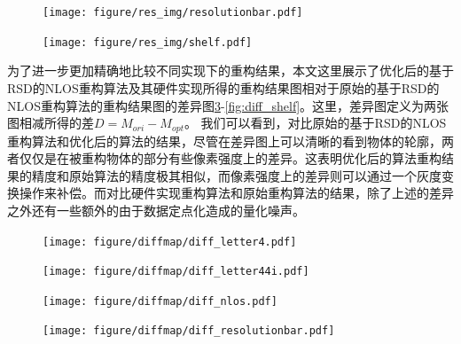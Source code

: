 \documentclass[master]{shtthesis}             %
\begin{document}
\begin{figure}[htbp]
  \centering
  \texttt{[image: figure/res\_img/resolutionbar.pdf]}
  \label{fig:resolutionbar}
\end{figure}

\begin{figure}[htbp]
  \centering
  \texttt{[image: figure/res\_img/shelf.pdf]}
  \label{fig:shelf}
\end{figure}

为了进一步更加精确地比较不同实现下的重构结果，本文这里展示了优化后的基于RSD的NLOS重构算法及其硬件实现所得的重构结果图相对于原始的基于RSD的NLOS重构算法的重构结果图的差异图\ref{fig:diff_l4}-\ref{fig:diff_shelf}。这里，差异图定义为两张图相减所得的差$D=M_{ori}-M_{opt}$。
我们可以看到，对比原始的基于RSD的NLOS重构算法和优化后的算法的结果，尽管在差异图上可以清晰的看到物体的轮廓，两者仅仅是在被重构物体的部分有些像素强度上的差异。这表明优化后的算法重构结果的精度和原始算法的精度极其相似，而像素强度上的差异则可以通过一个灰度变换操作来补偿。而对比硬件实现重构算法和原始重构算法的结果，除了上述的差异之外还有一些额外的由于数据定点化造成的量化噪声。


\begin{figure}[!b]
  \centering
  \texttt{[image: figure/diffmap/diff\_letter4.pdf]}
  \label{fig:diff_l4}
\end{figure}

\begin{figure}[!tb]
  \centering
  \texttt{[image: figure/diffmap/diff\_letter44i.pdf]}
  \label{fig:diff_l44i}
\end{figure}

\begin{figure}[!tb]
  \centering
  \texttt{[image: figure/diffmap/diff\_nlos.pdf]}
  \label{fig:diff_nlos}
\end{figure}

\begin{figure}[!tb]
  \centering
  \texttt{[image: figure/diffmap/diff\_resolutionbar.pdf]}
  \label{fig:diff_resolutionbar}
\end{figure}
\end{document}
